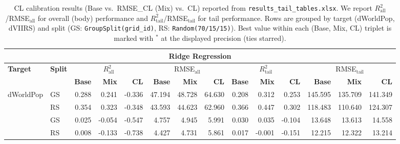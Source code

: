 \documentclass[pdflatex,sn-basic,Numbered]{sn-jnl}
\renewcommand{\arraystretch}{1.1}
\newcommand{\bst}{\rlap{$^{*}$}}
\begin{document}
\FloatBarrier
\begin{table}[!htbp]
\centering
\tiny
\setlength{\tabcolsep}{1.8pt}
\renewcommand{\arraystretch}{1.0}
\caption{CL calibration results (Base vs.\ RMSE\_CL (Mix) vs.\ CL) reported from \texttt{results\_tail\_tables.xlsx}. We report $R^2_{\mathrm{all}}$/RMSE$_{\mathrm{all}}$ for overall (body) performance and $R^2_{\mathrm{tail}}$/RMSE$_{\mathrm{tail}}$ for tail performance. Rows are grouped by target (dWorldPop, dVIIRS) and split (GS: \texttt{GroupSplit(grid\_id)}, RS: \texttt{Random(70/15/15)}). Best value within each (Base, Mix, CL) triplet is marked with $^{*}$ at the displayed precision (ties starred).}
\label{tab:cl_wide_blocks}
\begin{tabular*}{0.925\textwidth}{@{\extracolsep{\fill}}ll rrr @{\hspace{4pt}} rrr @{\hspace{4pt}} rrr @{\hspace{4pt}} rrr@{}}
\toprule
\multicolumn{14}{c}{\textbf{Ridge Regression}} \\
\midrule
\multirow{2}{*}{\textbf{Target}} & \multirow{2}{*}{\textbf{Split}} & \multicolumn{3}{c}{$R^2_{\mathrm{all}}$} & \multicolumn{3}{c}{RMSE$_{\mathrm{all}}$} & \multicolumn{3}{c}{$R^2_{\mathrm{tail}}$} & \multicolumn{3}{c}{RMSE$_{\mathrm{tail}}$} \\
\cmidrule(lr){3-5}\cmidrule(lr){6-8}\cmidrule(lr){9-11}\cmidrule(lr){12-14}
 &  & \textbf{Base} & \textbf{Mix} & \textbf{CL} & \textbf{Base} & \textbf{Mix} & \textbf{CL} & \textbf{Base} & \textbf{Mix} & \textbf{CL} & \textbf{Base} & \textbf{Mix} & \textbf{CL} \\
\midrule
\multirow{2}{*}{dWorldPop} & GS
& 0.288\bst & 0.241 & -0.336
& 47.194\bst & 48.728 & 64.630
& 0.208 & 0.312\bst & 0.253
& 145.595 & 135.709\bst & 141.349 \\
 & RS
& 0.354\bst & 0.323 & -0.348
& 43.593\bst & 44.623 & 62.960
& 0.366 & 0.447\bst & 0.302
& 118.483 & 110.640\bst & 124.307 \\
\addlinespace
\multirow{2}{*}{dVIIRS} & GS
& 0.025\bst & -0.054 & -0.547
& 4.757\bst & 4.945 & 5.991
& 0.030 & 0.035\bst & -0.104
& 13.648 & 13.613\bst & 14.558 \\
 & RS
& 0.008\bst & -0.133 & -0.738
& 4.427\bst & 4.731 & 5.861
& 0.017\bst & -0.001 & -0.151
& 12.215\bst & 12.322 & 13.214 \\
\bottomrule
\end{tabular*}


\end{table}
\end{document}
